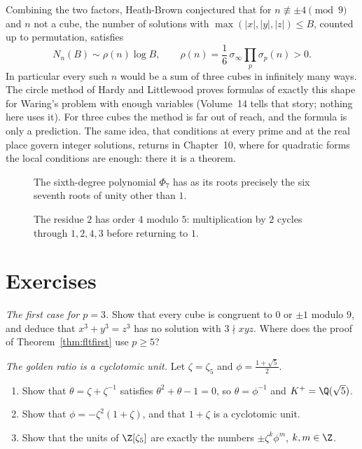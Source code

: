 \begin{remark}
Combining the two factors, Heath-Brown conjectured that for $n\not\equiv\pm4\pmod9$ and $n$ not a cube, the number of solutions
with $\max(|x|,|y|,|z|)\le B$, counted up to permutation, satisfies
\[
N_n(B)\sim\rho(n)\log B,\qquad\rho(n)=\frac16\,\sigma_\infty\prod_p\sigma_p(n)>0.
\]
In particular every such $n$ would be a sum of three cubes in infinitely many ways. The circle method of Hardy and Littlewood
proves formulas of exactly this shape for Waring's problem with enough variables (Volume~14 tells that story; nothing here
uses it). For three cubes the method is far out of reach, and the formula is only a prediction. The same idea, that conditions at
every prime and at the real place govern integer solutions, returns in Chapter~10, where for quadratic forms the local
conditions are enough: there it is a theorem.
\end{remark}

\begin{figure}[ht]
\centering
{}
\caption{The sixth-degree polynomial $\Phi_7$ has as its roots precisely the six seventh roots of unity other than $1$.}
\label{fig:v13-extra-07-a}
\end{figure}

\begin{figure}[ht]
\centering
{}
\caption{The residue $2$ has order $4$ modulo $5$: multiplication by $2$ cycles through $1,2,4,3$ before returning to $1$.}
\label{fig:v13-extra-07-b}
\end{figure}

\section{Exercises}

\begin{exercise}[$\star$]\label{ex:cubes9}
\emph{The first case for $p=3$.} Show that every cube is congruent to $0$ or $\pm1$ modulo $9$, and deduce that $x^3+y^3=z^3$
has no solution with $3\nmid xyz$. Where does the proof of Theorem~\ref{thm:fltfirst} use $p\ge5$?
\end{exercise}

\begin{exercise}[$\star\star$]\label{ex:golden}
\emph{The golden ratio is a cyclotomic unit.} Let $\zeta=\zeta_5$ and $\phi=\frac{1+\sqrt5}2$.
\begin{enumerate}[label=(\alph*)]
\item Show that $\theta=\zeta+\zeta^{-1}$ satisfies $\theta^2+\theta-1=0$, so $\theta=\phi^{-1}$ and $K^+=\Q(\sqrt5)$.
\item Show that $\phi=-\zeta^2(1+\zeta)$, and that $1+\zeta$ is a cyclotomic unit.
\item Show that the units of $\Z[\zeta_5]$ are exactly the numbers $\pm\zeta^k\phi^m$, $k,m\in\Z$.
\end{enumerate}
\end{exercise}

